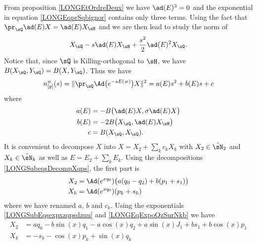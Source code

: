 %
From proposition \ref{LONGEtOrdreDeux} we have $\ad(E)^3=0$ and the exponential in equation \eqref{LONGEqprSqbignor} contains only three terms. Using the fact that $\pr_{\sQ}\ad(E)X=\ad(E)X_{\sH}$ and  we are then lead to study the norm of
\begin{equation}
	X_{\sQ}-s\ad(E)X_{\sH}+\frac{ s^2 }{2}\ad(E)^2X_{\sQ}.
\end{equation}
Notice that, since $\sQ$ is Killing-orthogonal to $\sH$, we have $B(X_{\sQ},Y_{\sQ})=B(X,Y_{\sQ})$. Thus we have
\begin{equation}
	n_{[g]}^w(s)=\|   \pr_{\sQ} \Ad\big(  e^{-s E(w)} \big)X  \|^2=a(E)s^2+b(E)s+c
\end{equation}
where
\begin{subequations}		\label{LONGSubEqsabcEBBB}
	\begin{align}
		a(E)&=-B\big( \ad(E)X,\sigma\ad(E)X \big)		\label{LONGEqCoefaEBX}\\
		b(E)&=-2B\big( X_{\sQ},\ad(E)X_{\sH} \big)\\
		c&=B(X_{\sQ},X_{\sQ}).
	\end{align}
\end{subequations}
%
%
It is convenient to decompose $X$ into $X=X_2+\sum_kc_kX_k$ with $X_2\in\tilde\sN_2$ and $X_k\in\tilde\sN_k$ as well as $E=E_2+\sum_kE_k$. Using the decompositions \eqref{LONGSubeqsDecompXqps}, the first part is
\begin{equation}
	\begin{aligned}[]
		X_2&=\Ad( e^{xq_0})\big( a(q_0-q_2)+b(p_1+s_1) \big)	\label{LONGEqXsiAdSTrois}\\
		X_k&=\Ad( e^{xq_0})(p_k+s_k)
	\end{aligned}
\end{equation}
%
where we have renamed $a$, $b$ and $c_k$. Using the exponentials \eqref{LONGSubEqsexpxzqpsdzuu} and \eqref{LONGEqExpoQzSurNkb} we have
\begin{subequations}
	\begin{align}
		X_2 &= aq_0-b\sin(x)q_1-a\cos(x)q_2 +a\sin(x)J_1+b s_1+b\cos(x)p_1	\label{LONGsubEqXtroisdonne}\\
		X_k &= -s_k-\cos(x)p_k+\sin(x)q_k					\label{LONGsubEqXkdonne}
	\end{align}
\end{subequations}

